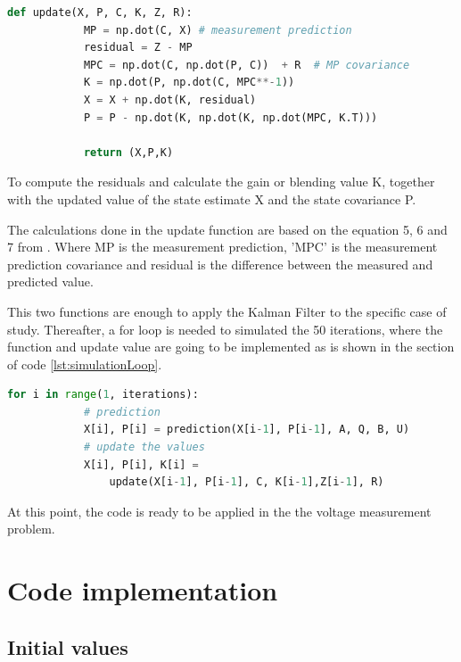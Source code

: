 \documentclass{article}
\begin{document}
    \begin{lstlisting}[language=Python, caption= Update Kalman function, label={lst:update}]
        def update(X, P, C, K, Z, R):
            MP = np.dot(C, X) # measurement prediction
            residual = Z - MP 
            MPC = np.dot(C, np.dot(P, C))  + R  # MP covariance
            K = np.dot(P, np.dot(C, MPC**-1)) 
            X = X + np.dot(K, residual) 
            P = P - np.dot(K, np.dot(K, np.dot(MPC, K.T))) 
    
            return (X,P,K) 
    \end{lstlisting}

    To compute the residuals and calculate the gain or blending value K, together with the updated value of the state estimate X and the
    state covariance P. 

    The calculations done in the update function are based on the equation 5, 6 and 7 from \cite{LabManual}. Where MP is the measurement prediction, 'MPC' is the measurement
    prediction covariance and residual is the difference between the measured and predicted value.

    This two functions are enough to apply the Kalman Filter to the specific case of study. Thereafter, a for loop is needed to simulated the
    50 iterations, where the function and update value are going to be implemented as is shown in the section of code \ref{lst:simulationLoop}.

    \begin{lstlisting}[language=Python, caption= Simulation for n amount if iterations, label={lst:simulationLoop}]
        for i in range(1, iterations):    
            # prediction
            X[i], P[i] = prediction(X[i-1], P[i-1], A, Q, B, U)
            # update the values
            X[i], P[i], K[i] = 
                update(X[i-1], P[i-1], C, K[i-1],Z[i-1], R)
    \end{lstlisting}

    At this point, the code is ready to be applied in the the voltage measurement problem.

    \section{Code implementation}

    \subsection{Initial values}
        
\end{document}
